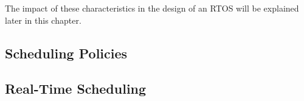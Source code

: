The impact of these characteristics in the design of an RTOS will be explained later in this chapter.


\subsection{Scheduling Policies}

\subsection{Real-Time Scheduling}
